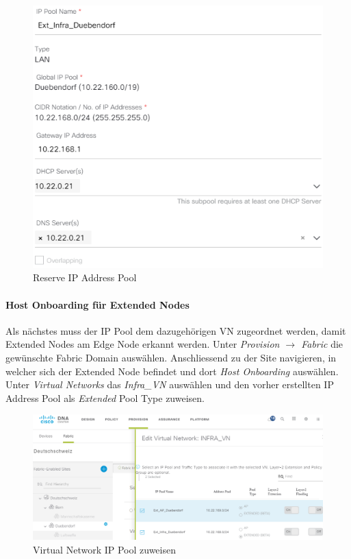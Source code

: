 \begin{figure}[H]
	\centering
	\includegraphics[width=0.6\linewidth]{img/Absicherung/ExtendedNode1}
	\caption{Reserve IP Address Pool}
	\label{fig:Reserve IP Address Pool}
\end{figure}

\paragraph{Host Onboarding für Extended Nodes} Als nächstes muss der IP Pool dem dazugehörigen VN zugeordnet werden, damit Extended Nodes am Edge Node erkannt werden. Unter \textit{Provision $\rightarrow$ Fabric} die gewünschte Fabric Domain auswählen. Anschliessend zu der Site navigieren, in welcher sich der Extended Node befindet und dort \textit{Host Onboarding} auswählen. Unter \textit{Virtual Networks} das \textit{Infra\_VN} auswählen und den vorher erstellten IP Address Pool als \textit{Extended} Pool Type zuweisen. 

\begin{figure}[H]
	\centering
	\includegraphics[width=1\linewidth]{img/Absicherung/ExtendedNode2}
	\caption{Virtual Network IP Pool zuweisen}
	\label{fig:Virtual Network IP Pool zuweisen}
\end{figure}

